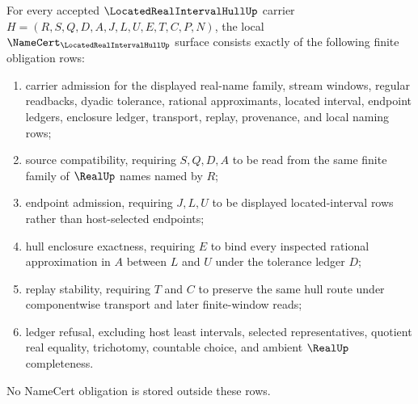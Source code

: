 \begin{theorem}
\label{thm:located-real-interval-hull-namecert-obligations}
For every accepted $\LocatedRealIntervalHullUp$ carrier $H=(R,S,Q,D,A,J,L,U,E,T,C,P,N)$, the local $\NameCert_{\LocatedRealIntervalHullUp}$ surface consists exactly of the following finite obligation rows:
\begin{enumerate}
\item carrier admission for the displayed real-name family, stream windows, regular readbacks, dyadic tolerance, rational approximants, located interval, endpoint ledgers, enclosure ledger, transport, replay, provenance, and local naming rows;
\item source compatibility, requiring $S,Q,D,A$ to be read from the same finite family of $\RealUp$ names named by $R$;
\item endpoint admission, requiring $J,L,U$ to be displayed located-interval rows rather than host-selected endpoints;
\item hull enclosure exactness, requiring $E$ to bind every inspected rational approximation in $A$ between $L$ and $U$ under the tolerance ledger $D$;
\item replay stability, requiring $T$ and $C$ to preserve the same hull route under componentwise transport and later finite-window reads;
\item ledger refusal, excluding host least intervals, selected representatives, quotient real equality, trichotomy, countable choice, and ambient $\RealUp$ completeness.
\end{enumerate}
No NameCert obligation is stored outside these rows.
\end{theorem}
